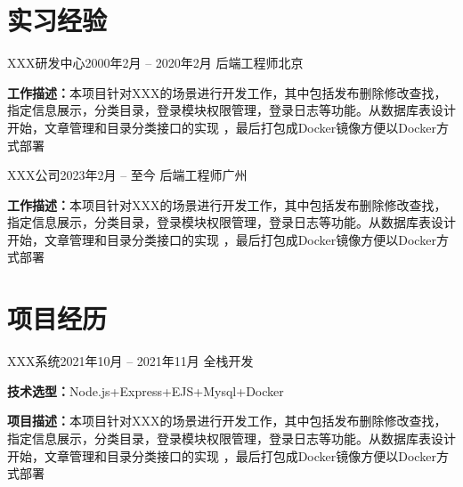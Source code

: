\documentclass[a4paper]{article}
\begin{document}
{\section{\textbf{实习经验}}
    \resumeTable
    {XXX研发中心}{2000年2月 -- 2020年2月}
    {后端工程师}{北京}
    
    \begin{minipage}{17cm}\vspace{2pt}
        \textbf{工作描述：}本项目针对XXX的场景进行开发工作，其中包括发布删除修改查找，指定信息展示，分类目录，登录模块权限管理，登录日志等功能。从数据库表设计开始，文章管理和目录分类接口的实现 ，最后打包成Docker镜像方便以Docker方式部署
    \end{minipage}

    \vspace{7pt}%

    \resumeTable
    {XXX公司}{2023年2月 -- 至今}
    {后端工程师}{广州}
    
    \begin{minipage}{17cm}\vspace{2pt}
        \textbf{工作描述：}本项目针对XXX的场景进行开发工作，其中包括发布删除修改查找，指定信息展示，分类目录，登录模块权限管理，登录日志等功能。从数据库表设计开始，文章管理和目录分类接口的实现 ，最后打包成Docker镜像方便以Docker方式部署
    \end{minipage}


\section{\textbf{项目经历}}
    \resumeTable
    {XXX系统}{2021年10月 -- 2021年11月}
    {全栈开发}{}
    \begin{minipage}{17cm}\vspace{2pt}
        \textbf{技术选型：}Node.js+Express+EJS+Mysql+Docker
    \end{minipage}
    

    \begin{minipage}{17cm}\vspace{2pt}
        \textbf{项目描述：}本项目针对XXX的场景进行开发工作，其中包括发布删除修改查找，指定信息展示，分类目录，登录模块权限管理，登录日志等功能。从数据库表设计开始，文章管理和目录分类接口的实现 ，最后打包成Docker镜像方便以Docker方式部署
    \end{minipage}

}
\end{document}
